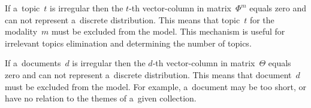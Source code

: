 \documentclass[russian]{llncs}
\begin{document}
\begin{note}
    If a~topic~$t$ is irregular
    then the $t$-th vector-column in matrix~$\Phi^m$ equals zero
    and can not represent a~discrete distribution.
    This means that topic~$t$ for the modality~$m$ must be excluded from the model.
    This mechanism is useful for irrelevant topics elimination and determining the number of topics.
\end{note}
\begin{note}
    If a~documents~$d$ is irregular
    then the $d$-th vector-column in matrix~$\Theta$ equals zero
    and can not represent a~discrete distribution.
    This means that document~$d$ must be excluded from the model.
    For example, a~document may be too short, or have no relation to the themes of a~given collection.
\end{note}
\end{document}
